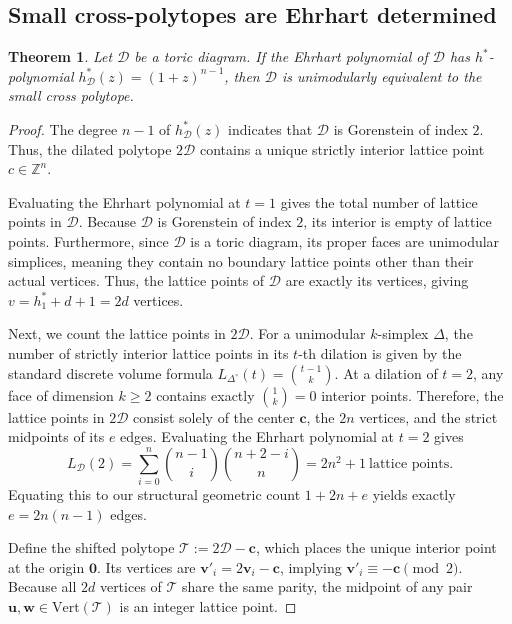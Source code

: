 \documentclass[a4paper,11pt,reqno]{amsart}
\newtheorem{theorem}{Theorem}[section]
\begin{document}
\subsection{Small cross-polytopes are Ehrhart determined} \label{ssec:determined}

\begin{theorem}
Let $\mathcal{D}$ be a toric diagram. If the Ehrhart polynomial of $\mathcal{D}$ has $h^*$-polynomial 
$h^*_\mathcal{D}(z) = (1+z)^{n-1}$, then $\mathcal{D}$ is unimodularly equivalent to the small cross polytope.
\end{theorem}
\begin{proof}
The degree $n-1$ of $h^*_\mathcal{D}(z)$ indicates that $\mathcal{D}$ is Gorenstein of index $2$. Thus, the 
dilated polytope $2\mathcal{D}$ contains a unique strictly interior lattice point $c \in \mathbb{Z}^n$. 
		
Evaluating the Ehrhart polynomial at $t=1$ gives the total number of lattice points in $\mathcal{D}$. 
Because $\mathcal{D}$ is Gorenstein of index $2$, its interior is empty of lattice points. Furthermore, 
since $\mathcal{D}$ is a toric diagram, its proper faces are unimodular simplices, meaning they contain 
no boundary lattice points other than their actual vertices. Thus, the lattice points of $\mathcal{D}$ are exactly 
its vertices, giving $v = h^*_1 + d + 1 = 2d$ vertices.
		
Next, we count the lattice points in $2\mathcal{D}$. For a unimodular $k$-simplex $\Delta$, the number of strictly 
interior lattice points in its $t$-th dilation is given by the standard discrete volume formula 
$L_{\Delta^\circ}(t) = \binom{t-1}{k}$. At a dilation of $t=2$, any face of dimension $k \ge 2$ contains exactly 
$\binom{1}{k} = 0$ interior points. Therefore, the lattice points in $2\mathcal{D}$ consist solely of the center $\bm{c}$, 
the $2n$ vertices, and the strict midpoints of its $e$ edges.  Evaluating the Ehrhart polynomial at $t=2$ gives
\[ 
L_{\mathcal{D}}(2) = \sum_{i=0}^n \binom{n-1}{i} \binom{n+2-i}{n} = 2n^2 + 1 \ \text{lattice points.}
\]
Equating this to our structural geometric count $1 + 2n + e$ yields exactly $e = 2n(n-1)$ edges.
		
Define the shifted polytope $\mathcal{T} := 2\mathcal{D} - \bm{c}$, which places the unique interior point at the origin 
$\mathbf{0}$. Its vertices are $\bm{v'}_i = 2\bm{v}_i - \bm{c}$, implying $\bm{v'}_i \equiv - \bm{c} \pmod 2$. Because 
all $2d$ vertices of $\mathcal{T}$ share the same parity, the midpoint of any pair $\bm{u}, \bm{w} \in \text{Vert}(\mathcal{T})$ 
is an integer lattice point. 
		

\end{proof}
\end{document}
